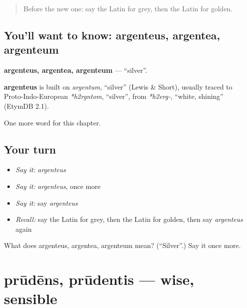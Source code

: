 \label{lesson:LA-C149-argenteus}



\begin{quote}
Before the new one: say the Latin for grey, then the Latin for golden.
\end{quote}

\subsection*{You'll want to know: argenteus, argentea, argenteum}
\textbf{argenteus, argentea, argenteum} — \textquotedblleft{}silver\textquotedblright{}.

\begin{cousinweb}
\textbf{argenteus} is built on \emph{argentum}, \textquotedblleft{}silver\textquotedblright{} (Lewis \& Short), usually traced to Proto-Indo-European \emph{*h2rgntom}, \textquotedblleft{}silver\textquotedblright{}, from \emph{*h2erg-}, \textquotedblleft{}white, shining\textquotedblright{} (EtymDB 2.1).
\end{cousinweb}

\begin{grammarlens}[title={What you've built}]
One more word for this chapter.
\end{grammarlens}

\subsection*{Your turn}
\begin{itemize}
\raggedright
  \item \emph{Say it:} \emph{argenteus}
  \item \emph{Say it:} \emph{argenteus}, once more
  \item \emph{Say it:} say \emph{argenteus}
  \item \emph{Recall:} say the Latin for grey, then the Latin for golden, then say \emph{argenteus} again
\end{itemize}

\begin{tcolorbox}[breakable,colback=teal!4,colframe=teal!35!black,title={Before you move on}]
What does argenteus, argentea, argenteum mean? (\textquotedblleft{}Silver\textquotedblright{}.) Say it once more.
\end{tcolorbox}
\section[prūdēns, prūdentis]{prūdēns, prūdentis — wise, sensible}

